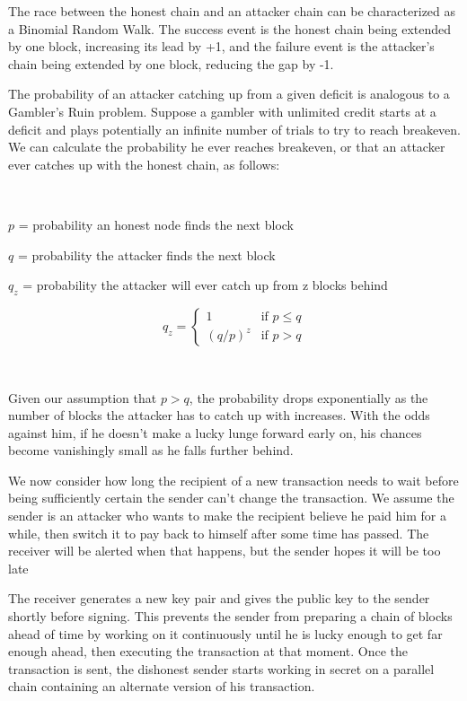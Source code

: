 \documentclass[nohyper]{tufte-handout}
\begin{document}
The race between the honest chain and an attacker chain can be
characterized as a Binomial Random Walk. The success event is the honest
chain being extended by one block, increasing its lead by +1, and the
failure event is the attacker's chain being extended by one block,
reducing the gap by -1.

The probability of an attacker catching up from a given deficit is
analogous to a Gambler's Ruin problem. Suppose a gambler with unlimited
credit starts at a deficit and plays potentially an infinite number of
trials to try to reach breakeven. We can calculate the probability he
ever reaches breakeven, or that an attacker ever catches up with the
honest chain, as follows\cite{fel57}:

\

\(p\) = {\small probability an honest node finds the next block}

\(q\) = {\small probability the attacker finds the next block}

\(q_z\) = {\small probability the attacker will ever catch up from z blocks behind}

\begin{equation}
    q_z = 
\begin{cases}
    1               & \text{if } p \leqslant q\\
    \left(q/p\right)^z & \text{if } p > q
\end{cases}
\end{equation}

\

Given our assumption that $p > q$, the probability drops
exponentially as the number of blocks the attacker has to catch up with
increases. With the odds against him, if he doesn't make a lucky lunge
forward early on, his chances become vanishingly small as he falls
further behind.

We now consider how long the recipient of a new transaction needs to
wait before being sufficiently certain the sender can't change the
transaction. We assume the sender is an attacker who wants to make the
recipient believe he paid him for a while, then switch it to pay back to
himself after some time has passed. The receiver will be alerted when
that happens, but the sender hopes it will be too late

The receiver generates a new key pair and gives the public key to the
sender shortly before signing. This prevents the sender from preparing a
chain of blocks ahead of time by working on it continuously until he is
lucky enough to get far enough ahead, then executing the transaction at
that moment. Once the transaction is sent, the dishonest sender starts
working in secret on a parallel chain containing an alternate version of
his transaction.
\end{document}
